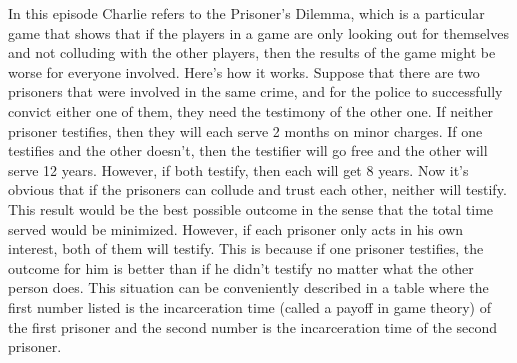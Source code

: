  \vspace{0.2cm}


In this episode Charlie refers to the Prisoner's Dilemma, which is a particular game that shows that if the players in a game are only looking out for themselves and not colluding with the other players, then the results of the game might be worse for everyone involved. Here's how it works. Suppose that there are two prisoners that were involved in the same crime, and for the police to successfully convict either one of them, they need the testimony of the other one. If neither prisoner testifies, then they will each serve 2 months on minor charges. If one testifies and the other doesn't, then the testifier will go free and the other will serve 12 years. However, if both testify, then each will get 8 years. Now it's obvious that if the prisoners can collude and trust each other, neither will testify. This result would be the best possible outcome in the sense that the total time served would be minimized. However, if each prisoner only acts in his own interest, both of them will testify. This is because if one prisoner testifies, the outcome for him is better than if he didn't testify no matter what the other person does. This situation can be conveniently described in a table where the first number listed is the incarceration time (called a payoff in game theory) of the first prisoner and the second number is the incarceration time of the second prisoner. \\

